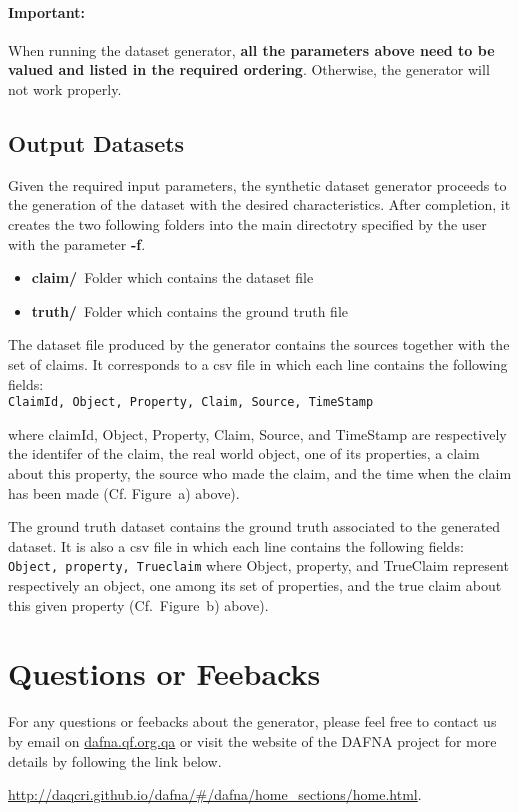 \documentclass[a4paper,10pt]{scrartcl}
\newcommand{\claim}[1]{\vspace*{0.5cm}\\\indent\indent\texttt{#1}\vspace*{0.5cm}}
\begin{document}
\paragraph{Important:}When running the dataset generator, \textbf{all the parameters above need to be valued and listed in the required ordering}.
Otherwise, the generator will not work properly.

\subsection{Output Datasets}
Given the required input parameters, the synthetic dataset generator proceeds to the generation 
of the dataset with the desired characteristics. After completion, it creates the two following
folders into the main directotry specified by the user with the parameter \textbf{-f}.
\begin{itemize}
 \item \textbf{claim/}~Folder which contains the dataset file 
 \item \textbf{truth/}~Folder which contains the ground truth file
\end{itemize}

The dataset file produced by the generator contains the sources together with the set of claims.
It corresponds to a csv file in which each line	contains the following fields:
\claim{ClaimId, Object, Property, Claim, Source, TimeStamp}

\noindent where claimId, Object, Property, Claim, Source, and TimeStamp are respectively the identifer of the claim,
the real world object, one of its properties, a claim about this property, the source who made the claim, and
the time when the claim has been made (Cf. Figure~a) above).

The ground truth dataset contains the ground truth associated to the generated dataset. It is also a csv file in which each line
contains the following fields:
\claim{Object, property, Trueclaim}
where Object, property, and TrueClaim represent respectively an object, one among its set of properties, and the true claim about
this given property (Cf.\ Figure~b) above).

\section{Questions or Feebacks}
For any questions or feebacks about the generator, please feel free to contact us by email on \href{mailto:lberti@qf.org.qa}{dafna.qf.org.qa}
or visit the website of the DAFNA project for more details by following the link below.

\href{http://daqcri.github.io/dafna/\#/dafna/home\_sections/home.html}{http://daqcri.github.io/dafna/\#/dafna/home\_sections/home.html}.
\end{document}
